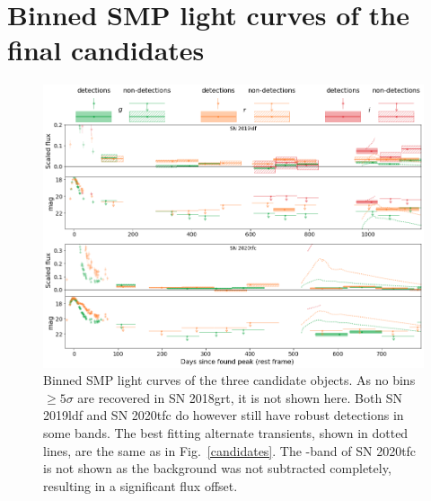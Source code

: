 \documentclass[a4paper,oneside,12pt, class=Latex/Classes/PhDthesisPSnPDF, crop=false]{standalone}
\begin{document}
\section{Binned SMP light curves of the final candidates}
\begin{figure}
 \centering
 \includegraphics[width=\textwidth]{../Images/chapter_3/candid_plots_smp.png}
 \caption{Binned SMP light curves of the three candidate objects. As no bins $\geq5\sigma$ are recovered in SN 2018grt, it is not shown here. Both SN 2019ldf and SN 2020tfc do however still have robust detections in some bands. The best fitting alternate transients, shown in dotted lines, are the same as in Fig.~\ref{candidates}. The \ztfi-band of SN 2020tfc is not shown as the background was not subtracted completely, resulting in a significant flux offset.}
 \label{final_candid_SMP}
\end{figure}
\end{document}

